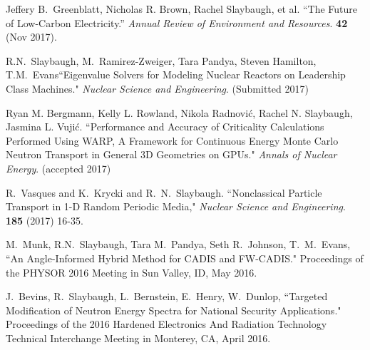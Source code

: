 \begin{bibsection}
\item Jeffery B.\ Greenblatt, Nicholas R. Brown, Rachel Slaybaugh, et al. ``The Future of Low-Carbon Electricity.'' \textit{Annual Review of Environment and Resources}. \textbf{42} (Nov 2017). %

\item R.N.\ Slaybaugh, M.\ Ramirez-Zweiger, Tara Pandya, Steven Hamilton, T.M.\ Evans``Eigenvalue Solvers for Modeling Nuclear Reactors on Leadership Class Machines." \textit{Nuclear Science and Engineering}. (Submitted 2017)%

\item Ryan M. Bergmann, Kelly L. Rowland, Nikola Radnovi\'c, Rachel N. Slaybaugh, Jasmina L. Vuji\'c. ``Performance and Accuracy of Criticality Calculations Performed Using WARP, A Framework for Continuous Energy Monte Carlo Neutron Transport in General 3D Geometries on GPUs." \textit{Annals of Nuclear Energy}. (accepted 2017)

\item R.\ Vasques and K.\ Krycki and R.\ N.\ Slaybaugh. ``Nonclassical Particle Transport in 1-D Random Periodic Media," \textit{Nuclear Science and Engineering}.  \textbf{185} (2017) 16-35.


\item M.\ Munk, R.N.\ Slaybaugh, Tara M.~Pandya, Seth R.~Johnson, T.~M.~Evans, ``An Angle-Informed Hybrid Method for CADIS and FW-CADIS." Proceedings of the PHYSOR 2016 Meeting in Sun Valley, ID, May 2016.

\item J.\ Bevins, R.\ Slaybaugh, L.\ Bernstein, E.\ Henry, W.\ Dunlop, ``Targeted Modification of Neutron Energy Spectra for National Security Applications." Proceedings of the 2016 Hardened Electronics And Radiation Technology Technical Interchange Meeting in Monterey, CA, April 2016.



\end{bibsection}
